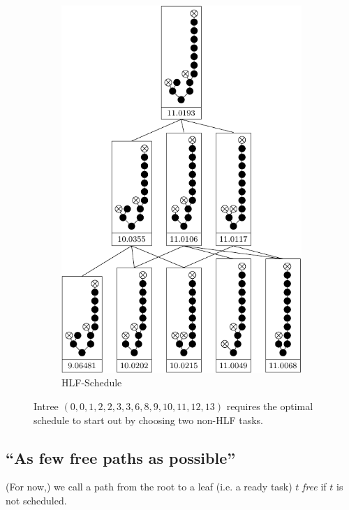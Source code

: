 \begin{figure}[ht]
\begin{subfigure}{.45\textwidth}
    \includegraphics{p3/2hlf_suboptimal/001223368910111213_subopt.pdf}
    \caption{HLF-Schedule}
  \end{subfigure}
  \caption{Intree $(0,0,1,2,2,3,3,6,8,9,10,11,12,13)$ requires the optimal schedule to start out by choosing two non-HLF tasks.}
  \label{fig:2-hlf-plus-one-not-optimal}
\end{figure}

\subsection{``As few free paths as possible''}
\label{sec:disproving-hlf-no-free-chain}

(For now,) we call a path from the root to a leaf (i.e. a ready task) $t$ \emph{free} if $t$ is not scheduled.

